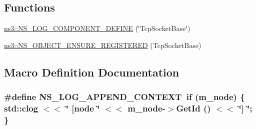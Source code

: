 \subsection*{Functions}
\begin{DoxyCompactItemize}
\item 
\hyperlink{namespacens3_af89e9eca6cf6a9931d06006ac057906d}{ns3\+::\+N\+S\+\_\+\+L\+O\+G\+\_\+\+C\+O\+M\+P\+O\+N\+E\+N\+T\+\_\+\+D\+E\+F\+I\+NE} (\char`\"{}Tcp\+Socket\+Base\char`\"{})
\item 
\hyperlink{namespacens3_ab811c897f358c4d34136e050411ee886}{ns3\+::\+N\+S\+\_\+\+O\+B\+J\+E\+C\+T\+\_\+\+E\+N\+S\+U\+R\+E\+\_\+\+R\+E\+G\+I\+S\+T\+E\+R\+ED} (Tcp\+Socket\+Base)
\end{DoxyCompactItemize}


\subsection{Macro Definition Documentation}
\subsubsection[{\texorpdfstring{N\+S\+\_\+\+L\+O\+G\+\_\+\+A\+P\+P\+E\+N\+D\+\_\+\+C\+O\+N\+T\+E\+XT}{NS_LOG_APPEND_CONTEXT}}]{\setlength{\rightskip}{0pt plus 5cm}\#define N\+S\+\_\+\+L\+O\+G\+\_\+\+A\+P\+P\+E\+N\+D\+\_\+\+C\+O\+N\+T\+E\+XT~{\bf if} (m\+\_\+node) \{ std\+::clog $<$$<$ \char`\"{} \mbox{[}node \char`\"{} $<$$<$ m\+\_\+node-\/$>$Get\+Id () $<$$<$ \char`\"{}\mbox{]} \char`\"{}; \}}\hypertarget{tcp-socket-base_8cc_abe50035652d407c40bdaef78214c4955}{}\label{tcp-socket-base_8cc_abe50035652d407c40bdaef78214c4955}
